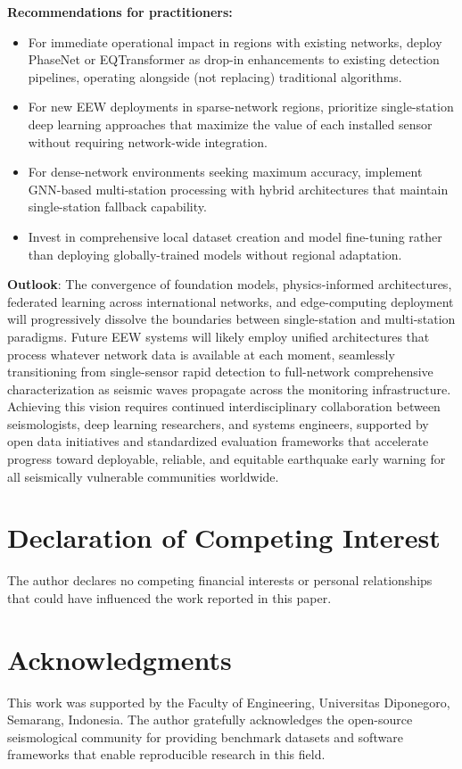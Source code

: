 \documentclass[review,authoryear]{elsarticle}
\begin{document}
\textbf{Recommendations for practitioners:}

\begin{itemize}
\item For immediate operational impact in regions with existing networks, deploy PhaseNet or EQTransformer as drop-in enhancements to existing detection pipelines, operating alongside (not replacing) traditional algorithms.
\item For new EEW deployments in sparse-network regions, prioritize single-station deep learning approaches that maximize the value of each installed sensor without requiring network-wide integration.
\item For dense-network environments seeking maximum accuracy, implement GNN-based multi-station processing with hybrid architectures that maintain single-station fallback capability.
\item Invest in comprehensive local dataset creation and model fine-tuning rather than deploying globally-trained models without regional adaptation.
\end{itemize}

\textbf{Outlook}: The convergence of foundation models, physics-informed architectures, federated learning across international networks, and edge-computing deployment will progressively dissolve the boundaries between single-station and multi-station paradigms. Future EEW systems will likely employ unified architectures that process whatever network data is available at each moment, seamlessly transitioning from single-sensor rapid detection to full-network comprehensive characterization as seismic waves propagate across the monitoring infrastructure. Achieving this vision requires continued interdisciplinary collaboration between seismologists, deep learning researchers, and systems engineers, supported by open data initiatives and standardized evaluation frameworks that accelerate progress toward deployable, reliable, and equitable earthquake early warning for all seismically vulnerable communities worldwide.


\section*{Declaration of Competing Interest}
The author declares no competing financial interests or personal relationships that could have influenced the work reported in this paper.

\section*{Acknowledgments}
This work was supported by the Faculty of Engineering, Universitas Diponegoro, Semarang, Indonesia. The author gratefully acknowledges the open-source seismological community for providing benchmark datasets and software frameworks that enable reproducible research in this field.



\end{document}
